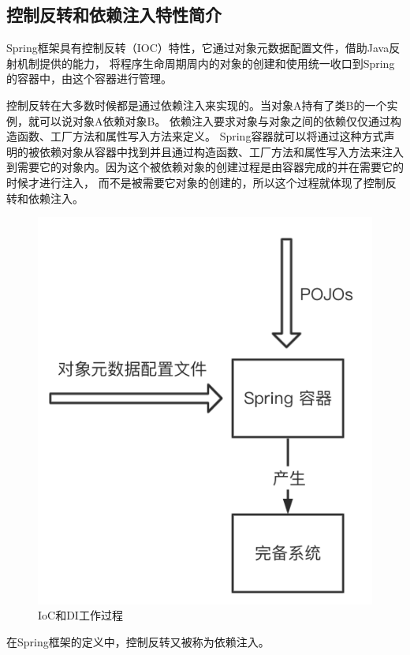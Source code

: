 \subsection{控制反转和依赖注入特性简介}
Spring框架具有控制反转（IOC）特性，它通过对象元数据配置文件，借助Java反射机制提供的能力，
将程序生命周期周内的对象的创建和使用统一收口到Spring的容器中，由这个容器进行管理。

控制反转在大多数时候都是通过依赖注入来实现的。当对象A持有了类B的一个实例，就可以说对象A依赖对象B。
依赖注入要求对象与对象之间的依赖仅仅通过构造函数、工厂方法和属性写入方法来定义。
Spring容器就可以将通过这种方式声明的被依赖对象从容器中找到并且通过构造函数、工厂方法和属性写入方法来注入
到需要它的对象内。因为这个被依赖对象的创建过程是由容器完成的并在需要它的时候才进行注入，
而不是被需要它对象的创建的，所以这个过程就体现了控制反转和依赖注入。

\begin{figure}[ht]
    \centering   
    \includegraphics[scale=.3]{./Figure/IMG_container.png}
    \caption{IoC和DI工作过程}\label{Fig:erd}
\end{figure}

在Spring框架的定义中，控制反转又被称为依赖注入。


